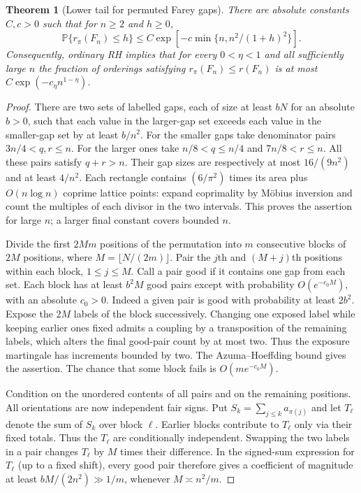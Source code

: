\documentclass[11pt,a4paper]{article}
\newtheorem{theorem}{Theorem}[section]
\begin{document}
\begin{theorem}[Lower tail for permuted Farey gaps]
\label{thm:fareytail}
There are absolute constants $C,c>0$ such that for $n\ge2$ and $h\ge0$,
\[
 \mathbb P\{r_\pi(F_n)\le h\}
 \le C\exp\!\left[-c\min\{n,n^2/(1+h)^2\}\right].
\]
Consequently, ordinary RH implies that for every $0<\eta<1$ and
all sufficiently large $n$ the fraction of orderings satisfying
$r_\pi(F_n)\le r(F_n)$ is at most $C\exp(-c_\eta n^{1-\eta})$.
\end{theorem}

\begin{proof}
There are two sets of labelled gaps, each of size at least $bN$ for an
absolute $b>0$, such that each value in the larger-gap set exceeds
each value in the smaller-gap set by at least $b/n^2$.
For the smaller gaps take denominator pairs $3n/4<q,r\le n$.
For the larger ones take $n/8<q\le n/4$ and $7n/8<r\le n$.
All these pairs satisfy $q+r>n$. Their gap sizes are respectively at
most $16/(9n^2)$ and at least $4/n^2$. Each rectangle contains
$(6/\pi^2)$ times its area plus $O(n\log n)$ coprime lattice points:
expand coprimality by M\"obius inversion and count the multiples of
each divisor in the two intervals. This proves the assertion for
large $n$; a larger final constant covers bounded $n$.

Divide the first $2Mm$ positions of the permutation into $m$ consecutive
blocks of $2M$ positions, where $M=\lfloor N/(2m)\rfloor$.
Pair the $j$th and $(M+j)$th positions within each block, $1\le j\le M$.
Call a pair good if it contains one gap from each set. Each block has
at least $b^2M$ good pairs except with probability $O(e^{-c_0M})$,
with an absolute $c_0>0$. Indeed a given pair is good with probability
at least $2b^2$. Expose the $2M$ labels of the block successively.
Changing one exposed label while keeping earlier ones fixed admits
a coupling by a transposition of the remaining labels, which alters
the final good-pair count by at most two. Thus the exposure martingale
has increments bounded by two. The Azuma--Hoeffding bound gives
the assertion. The chance that some block fails is $O(me^{-c_0M})$.

Condition on the unordered contents of all pairs and on the remaining
positions. All orientations are now independent fair signs. Put
$S_k=\sum_{j\le k}a_{\pi(j)}$ and let $T_\ell$ denote
the sum of $S_k$ over block $\ell$. Earlier blocks contribute to
$T_\ell$ only via their fixed totals. Thus the $T_\ell$ are conditionally
independent. Swapping the two labels in a pair changes $T_\ell$ by
$M$ times their difference. In the signed-sum expression for $T_\ell$
(up to a fixed shift), every good pair therefore gives a coefficient
of magnitude at least $bM/(2n^2)\gg1/m$, whenever $M\asymp n^2/m$.


\end{proof}
\end{document}
